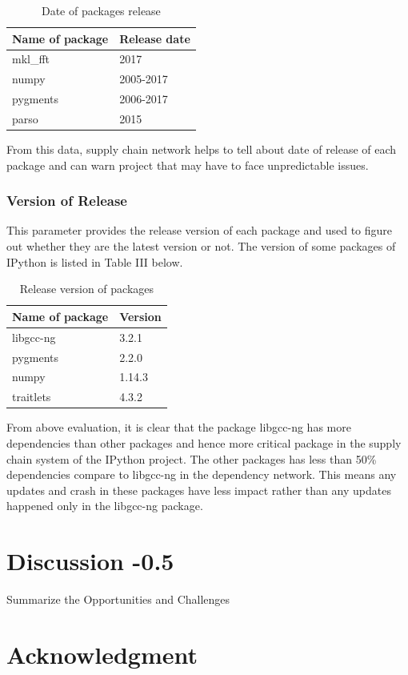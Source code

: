 \documentclass[10pt,conference]{IEEEtran}
\begin{document}
\begin{table} [h]
\begin{center}
\caption{Date of packages release}
\begin{tabular}{ |p{3.5cm}|p{3.5cm}| }
\hline
 Name of package&Release date \\
 \hline
mkl\_fft & 2017\\
 \hline
numpy & 2005-2017\\
    \hline
 pygments & 2006-2017\\
 \hline
 parso & 2015 \\

    \hline
   
\end{tabular}

\end{center}
\end{table}

From this data, supply chain network helps to tell about date of release of each package and can warn project that may have to face unpredictable issues.
\subsubsection{Version of Release}
This parameter provides the release version of each package and used to figure out whether they are the latest version or not. The version of some packages of IPython is listed in Table III below.  

\begin{table} [h]
\begin{center}
\caption{Release version of packages}
\begin{tabular}{ |p{3.5cm}|p{3.5cm}| }
\hline
 Name of package&Version \\
 \hline
libgcc-ng  & 3.2.1\\
 \hline
pygments  & 2.2.0\\
    \hline
 numpy &1.14.3\\
 \hline
 traitlets & 4.3.2\\

    \hline
   
\end{tabular}

\end{center}
\end{table}



From above evaluation, it is clear that the package libgcc-ng has more dependencies than other packages and hence more critical package in the supply chain system of the IPython project. The other packages has less than 50\% dependencies compare to libgcc-ng in the dependency network. This means any updates and crash in these packages have less impact rather than any updates happened only in the libgcc-ng package.




\section{Discussion -0.5}

Summarize the Opportunities and Challenges 



\section*{Acknowledgment}



\end{document}
